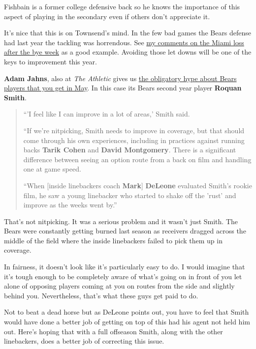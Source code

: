 \documentclass[11pt]{article}
\begin{document}
\begin{itemize}
Fishbain is a former college defensive back so he knows the importance of this aspect of playing in the secondary even if others don't appreciate it.

It’s nice that this is on Townsend’s mind. In the few bad games the Bears defense had last year the tackling was horrendous. See \href{http://bearingthenews.com/blog/2018/10/14/quick-game-comments-bears-dolphins-101418/}{my comments on the Miami loss after the bye week} as a good example. Avoiding those let downs will be one of the keys to improvement this year.

\textbf{Adam Jahns}, also at \emph{The Athletic} gives us \href{https://theathletic.com/991989/2019/05/23/jahns-dont-forget-about-roquan-smith-the-bears-elite-lb-in-the-making/}{the obligatory hype about Bears players that you get in May}.  In this case its Bears second year player \textbf{Roquan Smith}.

\begin{quote}
``'I feel like I can improve in a lot of areas,' Smith said.

``If we’re nitpicking, Smith needs to improve in coverage, but that should come through his own experiences, including in practices against running backs \textbf{Tarik Cohen} and \textbf{David Montgomery}. There is a significant difference between seeing an option route from a back on film and handling one at game speed.

``When [inside linebackers coach \textbf{Mark}] \textbf{DeLeone} evaluated Smith’s rookie film, he saw a young linebacker who started to shake off the 'rust' and improve as the weeks went by.''
\end{quote}

That's not nitpicking.  It was a serious problem and it wasn't just Smith.  The Bears were constantly getting burned last season as receivers dragged across the middle of the field where the inside linebackers failed to pick them up in coverage.

In fairness, it doesn't look like it's particularly easy to do.  I would imagine that it's tough enough to be completely aware of what's going on in front of you let alone of opposing players coming at you on routes from the side and slightly behind you.  Nevertheless, that's what these guys get paid to do.

Not to beat a dead horse but as DeLeone points out, you have to feel that Smith would have done a better job of getting on top of this had his agent not held him out.  Here's hoping that with a full offseason Smith, along with the other linebackers, does a better job of correcting this issue.

\end{itemize}
\end{document}
